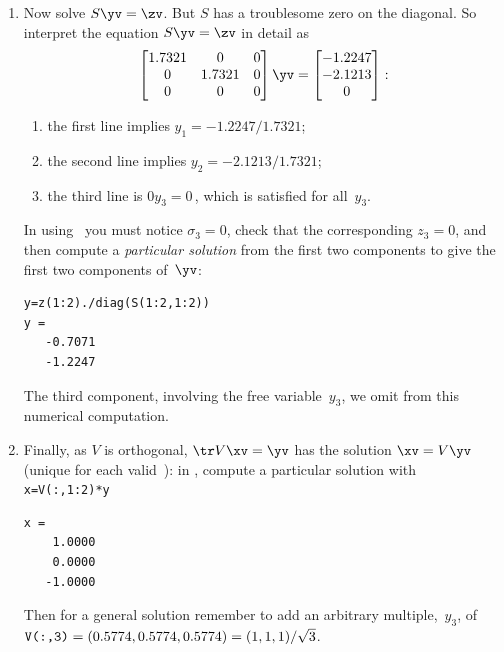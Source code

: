 \begin{example}
\begin{solution}
\begin{enumerate}
\item Now solve \(S\yv=\zv\).
But \(S\) has a troublesome zero on the diagonal. 
So interpret the equation \(S\yv=\zv\) in detail as
\begin{equation*}
\begin{bmatrix} 1.7321&0&0
\\0&1.7321&0
\\0&0&0 \end{bmatrix}\yv=\begin{bmatrix} 
   -1.2247\\-2.1213\\0
\end{bmatrix}:
\end{equation*}
\begin{enumerate}
\item the first line implies \(y_1=-1.2247/1.7321\);
\item the second line implies \(y_2=-2.1213/1.7321\);
\item the third line is \(0y_3=0\)\,, which is satisfied for all~\(y_3\).
\end{enumerate}
In using \script\ you must notice \(\sigma_3=0\), check that the corresponding \(z_3=0\), and then compute a \emph{particular solution} from the first two components to give the first two components of~\(\yv\):
\begin{verbatim}
y=z(1:2)./diag(S(1:2,1:2))
y =
   -0.7071
   -1.2247
\end{verbatim}
The third component, involving the free variable~\(y_3\), we omit from this numerical computation.

\item Finally, as \(V\) is orthogonal, \(\tr V\xv=\yv\) has the solution \(\xv=V\yv\) (unique for each valid~\yv):
in \script, compute a particular solution with \verb|x=V(:,1:2)*y| 
\begin{verbatim}
x =
    1.0000
    0.0000
   -1.0000
\end{verbatim}
Then for a general solution remember to add an arbitrary multiple,~\(y_3\), of \(\verb|V(:,3)|=(0.5774,0.5774,0.5774)=(1,1,1)/\sqrt3\).
\end{enumerate}


\end{solution}
\end{example}

